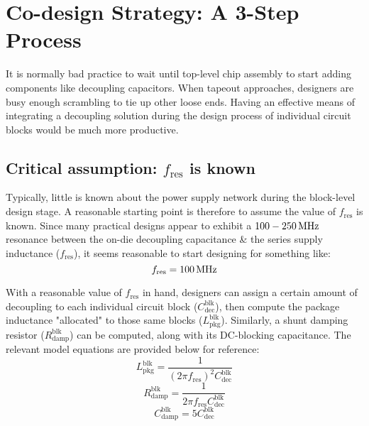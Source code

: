 \section{Co-design Strategy: A 3-Step Process}
\par It is normally bad practice to wait until top-level chip assembly to
start adding components like decoupling capacitors. When tapeout approaches,
designers are busy enough scrambling to tie up other loose ends.
Having an effective means of integrating a decoupling solution during
the design process of individual circuit blocks would be much more
productive.
%
\subsection{Critical assumption: $f_\mathrm{res}$ is known}
\par Typically, little is known about the power supply network during the
block-level design stage.  A reasonable starting point is therefore to assume the
value of $f_\mathrm{res}$ is known. Since many practical designs appear to
exhibit a $100-250\mathrm{\,MHz}$ resonance between the on-die decoupling capacitance
\& the series supply inductance ($f_\mathrm{res}$), it seems reasonable
to start designing for something like:
\begin{equation}
	f_\mathrm{res}=100\mathrm{\,MHz}
\end{equation}
%
\par With a reasonable value of $f_\mathrm{res}$ in hand, designers can
assign a certain amount of decoupling to each individual circuit block
($C_\mathrm{dec}^\mathrm{blk}$), then compute the package inductance
"allocated" to those same blocks ($L_\mathrm{pkg}^\mathrm{blk}$).
Similarly, a shunt damping resistor ($R_\mathrm{damp}^\mathrm{blk}$)
can be computed, along with its DC-blocking capacitance. The relevant
model equations are provided below for reference:
%
\begin{equation}
	L_\mathrm{pkg}^\mathrm{blk} = \frac{1}{(2\pi f_\mathrm{res})^2 C_\mathrm{dec}^\mathrm{blk}}
\end{equation}
\begin{equation}
	R_\mathrm{damp}^\mathrm{blk} = \frac{1}{2\pi f_\mathrm{res}C_\mathrm{dec}^\mathrm{blk}}
\end{equation}
\begin{equation}
	C_\mathrm{damp}^\mathrm{blk} = 5C_\mathrm{dec}^\mathrm{blk}
\end{equation}
%
